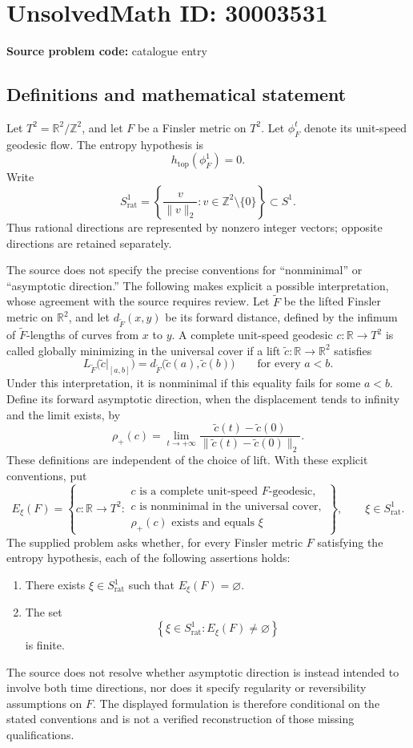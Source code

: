 \documentclass[11pt]{article}
\newcommand{\Z}{\mathbb{Z}}
\newcommand{\R}{\mathbb{R}}
\begin{document}
\section*{UnsolvedMath ID: 30003531}
\textbf{Source problem code:} catalogue entry
\subsection{Definitions and mathematical statement}
Let \(T^2=\R^2/\Z^2\), and let \(F\) be a Finsler metric on \(T^2\). Let \(\phi_F^t\) denote its unit-speed geodesic flow. The entropy hypothesis is
\[
 h_{\mathrm{top}}(\phi_F^1)=0.
\]
Write
\[
 S^1_{\mathrm{rat}}=\left\{\frac{v}{\lVert v\rVert_2}:v\in\Z^2\setminus\{0\}\right\}\subset S^1.
\]
Thus rational directions are represented by nonzero integer vectors; opposite directions are retained separately.

The source does not specify the precise conventions for ``nonminimal'' or ``asymptotic direction.'' The following makes explicit a possible interpretation, whose agreement with the source requires review. Let \(\widetilde F\) be the lifted Finsler metric on \(\R^2\), and let \(d_{\widetilde F}(x,y)\) be its forward distance, defined by the infimum of \(\widetilde F\)-lengths of curves from \(x\) to \(y\). A complete unit-speed geodesic \(c:\R\to T^2\) is called globally minimizing in the universal cover if a lift \(\widetilde c:\R\to\R^2\) satisfies
\[
 L_{\widetilde F}\bigl(\widetilde c|_{[a,b]}\bigr)
 =d_{\widetilde F}\bigl(\widetilde c(a),\widetilde c(b)\bigr)
 \qquad\text{for every }a<b.
\]
Under this interpretation, it is nonminimal if this equality fails for some \(a<b\). Define its forward asymptotic direction, when the displacement tends to infinity and the limit exists, by
\[
 \rho_+(c)=\lim_{t\to+\infty}
 \frac{\widetilde c(t)-\widetilde c(0)}
 {\lVert\widetilde c(t)-\widetilde c(0)\rVert_2}.
\]
These definitions are independent of the choice of lift. With these explicit conventions, put
\[
 E_\xi(F)=\left\{c:\R\to T^2:
 \begin{array}{l}
 c\text{ is a complete unit-speed }F\text{-geodesic},\\
 c\text{ is nonminimal in the universal cover},\\
 \rho_+(c)\text{ exists and equals }\xi
 \end{array}\right\},\qquad \xi\in S^1_{\mathrm{rat}}.
\]
The supplied problem asks whether, for every Finsler metric \(F\) satisfying the entropy hypothesis, each of the following assertions holds:
\begin{enumerate}
\item There exists \(\xi\in S^1_{\mathrm{rat}}\) such that \(E_\xi(F)=\varnothing\).
\item The set
\[
 \left\{\xi\in S^1_{\mathrm{rat}}:E_\xi(F)\ne\varnothing\right\}
\]
is finite.
\end{enumerate}
The source does not resolve whether asymptotic direction is instead intended to involve both time directions, nor does it specify regularity or reversibility assumptions on \(F\). The displayed formulation is therefore conditional on the stated conventions and is not a verified reconstruction of those missing qualifications.
\end{document}
